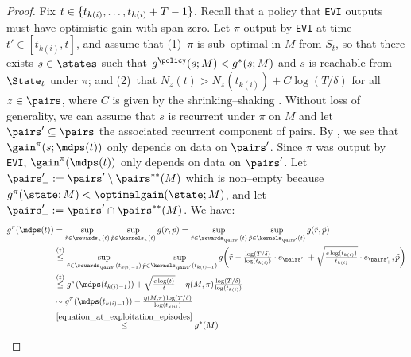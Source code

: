 \documentclass[preprint,cleveref,12pt]{colt2025}
\DeclarePairedDelimiter{\braces}{\{}{\}}	%
\DeclarePairedDelimiter{\parens}{(}{)}	%
\def\models{\mdps}
\def\optgain{\optimalgain} %
\begin{document}
\begin{proof}
        Fix $t \in \braces{t_{k(i)}, \ldots, t_{k(i)}+T-1}$.
        Recall that a policy that \texttt{EVI} outputs must have optimistic gain with span zero.
        Let $\pi$ output by \texttt{EVI} at time $t' \in [t_{k(i)}, t]$, and assume that 
        (1)~$\pi$ is sub--optimal in $M$ from $S_t$, so that there exists $s \in \states$ such that $g^\policy(s; M) < g^*(s;M)$ and $s$ is reachable from $\State_t$ under $\pi$; and
        (2)~that $N_z(t) > N_z(t_{k(i)}) + C \log(T/\delta)$ for all $z \in \pairs$, where $C$ is given by the shrinking--shaking .
        Without loss of generality, we can assume that $s$ is recurrent under $\pi$ on $M$ and let $\pairs' \subseteq \pairs$ the associated recurrent component of pairs.
        By , we see that $\gain^\pi(s; \models(t))$ only depends on data on $\pairs'$.
        Since $\pi$ was output by \texttt{EVI}, $\gain^\pi(\models(t))$ only depends on data on $\pairs'$.
        Let $\pairs'_- := \pairs' \setminus \pairs^{**}(M)$ which is non--empty because $g^{\pi}(\state; M) < \optgain(\state; M)$, and let $\pairs'_+ := \pairs' \cap \pairs^{**}(M)$.
        We have:
        \begin{align*}
            g^\pi(\models(t)) 
            & =
            \sup_{\tilde{r} \in \rewards_\pi(t)} \sup_{\tilde{p} \in \kernels_\pi(t)} g(r, p)
            =
            \sup_{\tilde{r} \in \rewards_{\pairs'}(t)}
            \sup_{\tilde{p} \in \kernels_{\pairs'}(t)}
            g\parens*{
                \tilde{r},
                \tilde{p}
            }
            \\
            & \overset{(\dagger)}\le 
            \sup_{\tilde{r} \in \rewards_{\pairs'}(t_{k(i)-1})}
            \sup_{\tilde{p} \in \kernels_{\pairs'}(t_{k(i)-1})}
            g\parens*{
                \tilde{r} - \tfrac{\log(T/\delta)}{\log(t_{k(i)})} \cdot e_{\pairs'_-} + \sqrt{\tfrac{c\log(t_{k(i)})}{t_{k(i)}}} \cdot e_{\pairs'_+},
                \tilde{p}
            }
            \\
            & \overset{(\ddagger)}\le 
            g^\pi(\models(t_{k(i)-1})) 
            + \sqrt{\tfrac {c \log(t)}t}
            - \eta(M, \pi) \tfrac{\log(T/\delta)}{\log (t_{k(i)})}
            \\
            & \sim
            g^\pi(\models(t_{k(i)-1})) 
            - \tfrac{\eta(M, \pi) \log(T/\delta)}{\log (t_{k(i)})}
            \\
            & \overset{\eqref{equation_at_exploitation_episodes}}\le 
            g^*(M) 

\end{align*}
\end{proof}
\end{document}
